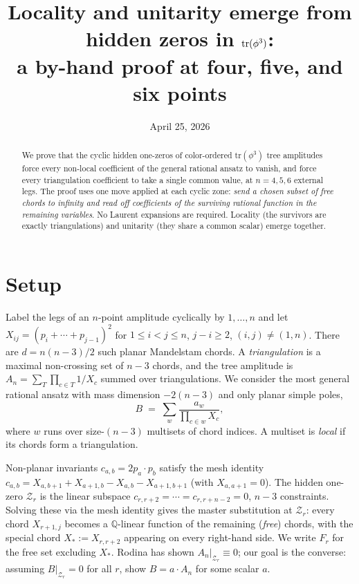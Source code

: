 \documentclass[11pt]{article}
\title{Locality and unitarity emerge from hidden zeros in $\tphi$:\\
a by-hand proof at four, five, and six points}
\date{April 25, 2026}
\newcommand{\tphi}{\mathrm{tr}(\phi^3)}
\newcommand{\Zr}{\mathcal{Z}}
\newcommand{\Fr}{F}
\begin{document}
\maketitle

\begin{abstract}
We prove that the cyclic hidden one-zeros of color-ordered
$\tphi$ tree amplitudes force every non-local coefficient of the
general rational ansatz to vanish, and force every triangulation
coefficient to take a single common value, at $n=4,5,6$ external
legs.  The proof uses one move applied at each cyclic zone:
\emph{send a chosen subset of free chords to infinity and read off
coefficients of the surviving rational function in the remaining
variables}.  No Laurent expansions are required.  Locality (the
survivors are exactly triangulations) and unitarity (they share a
common scalar) emerge together.
\end{abstract}

\section{Setup}

Label the legs of an $n$-point amplitude cyclically by $1,\dots,n$
and let $X_{ij}=(p_i+\cdots+p_{j-1})^2$ for $1\le i<j\le n$, $j-i\ge 2$,
$(i,j)\ne(1,n)$.  There are $d=n(n-3)/2$ such planar Mandelstam
chords.  A \emph{triangulation} is a maximal non-crossing set of
$n-3$ chords, and the tree amplitude is
$A_n = \sum_{T}\prod_{c\in T}1/X_c$ summed over triangulations.
We consider the most general rational ansatz with mass dimension
$-2(n-3)$ and only planar simple poles,
\begin{equation}\label{eq:ansatz}
B \;=\; \sum_{w}\frac{a_w}{\prod_{c\in w}X_c},
\end{equation}
where $w$ runs over size-$(n-3)$ multisets of chord indices.  A
multiset is \emph{local} if its chords form a triangulation.

Non-planar invariants $c_{a,b}=2p_a\cdot p_b$ satisfy the mesh identity
$c_{a,b}=X_{a,b+1}+X_{a+1,b}-X_{a,b}-X_{a+1,b+1}$ (with $X_{a,a+1}=0$).
The hidden one-zero $\Zr_r$ is the linear subspace
$c_{r,r+2}=\cdots=c_{r,r+n-2}=0$, $n-3$ constraints.  Solving these
via the mesh identity gives the master substitution at $\Zr_r$:
every chord $X_{r+1,j}$ becomes a $\mathbb{Q}$-linear function of
the remaining (\emph{free}) chords, with the special chord
$X_*:=X_{r,r+2}$ appearing on every right-hand side.  We write
$\Fr_r$ for the free set excluding $X_*$.  Rodina has shown
$A_n|_{\Zr_r}\equiv0$; our goal is the converse: assuming
$B|_{\Zr_r}=0$ for all $r$, show $B=a\cdot A_n$ for some scalar $a$.
\end{document}
